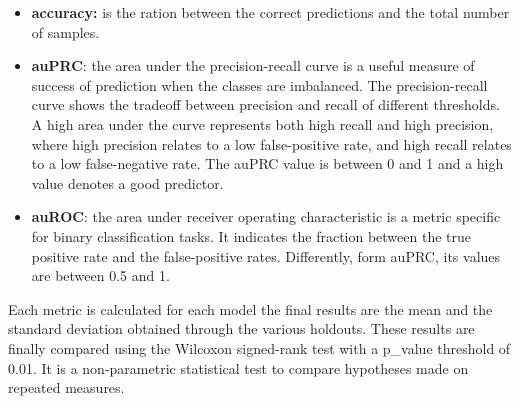 \begin{itemize}
	\item
	\textbf{accuracy:} is the ration between the correct predictions and
	the total number of samples.
	\item
	\textbf{auPRC}: the area under the precision-recall curve is a useful
	measure of success of prediction when the classes are imbalanced. The
	precision-recall curve shows the tradeoff between precision and recall
	of different thresholds. A high area under the curve represents both
	high recall and high precision, where high precision relates to a low
	false-positive rate, and high recall relates to a low false-negative
	rate. The auPRC value is between 0 and 1 and a high value denotes a
	good predictor.
	\item
	\textbf{auROC}: the area under receiver operating characteristic is a
	metric specific for binary classification tasks. It indicates the
	fraction between the true positive rate and the false-positive rates.
	Differently, form auPRC, its values are between 0.5 and 1.
\end{itemize}

Each metric is calculated for each model the final results are the mean
and the standard deviation obtained through the various holdouts. These
results are finally compared using the Wilcoxon signed-rank test with a
p\_value threshold of 0.01. It is a non-parametric statistical test to
compare hypotheses made on repeated measures.